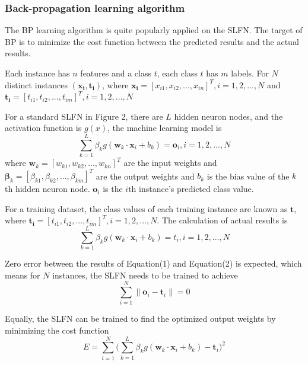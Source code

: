 \documentclass[a4paper, 14pt]{extarticle}
\begin{document}
\subsubsection{Back-propagation learning algorithm}
\par The BP learning algorithm is quite popularly applied on the SLFN. The target of BP is to minimize the cost function between the predicted results and the actual results. 
\par Each instance has \(n\) features and a class \(t\), each class \(t\) has \(m\) labels. For \(N\) distinct instances \((\mathbf{x_i}, \mathbf{t_i})\), where \(\mathbf{x_i} = [x_{i1}, x_{i2}, ..., x_{in}]^T , i = 1, 2, ..., N\) and \(\mathbf{t_i} = [t_{i1}, t_{i2}, ..., t_{im}]^T , i = 1, 2, ..., N\) \cite{G.B.Huang-ICNN}
\par For a standard SLFN in Figure 2, there are \(L\) hidden neuron nodes, and the activation function is \(g(x)\), the machine learning model is\cite{G.B.Huang-ICNN} 
\begin{equation}
  \sum_{k=1}^L{\beta_k}g(\mathbf{w}_k \cdot \mathbf{x}_i + b_k) = \mathbf{o}_i,  i = 1, 2, ..., N
\end{equation}
where \( \mathbf{w}_k = [w_{k1}, w_{k2}, ..., w_{kn}]^T \) are the input weights and \( \mathbf{\beta}_k = [\beta_{k1}, \beta_{k2}, ..., \beta_{km}]^T \) are the output weights and \(b_k\) is the bias value of the \(k\)th hidden neuron node. \(\mathbf{o}_i\) is the \(i\)th instance's predicted class value. 
\par For a training dataset, the class values of each training instance are known as \(\mathbf{t}\), where \(\mathbf{t_i} = [t_{i1}, t_{i2}, ..., t_{im}]^T , i = 1, 2, ..., N\). The calculation of actual results is \cite{G.B.Huang-ICNN}
\begin{equation}
  \sum_{k=1}^L{\beta_k}g(\mathbf{w}_k \cdot \mathbf{x}_i + b_k) = t_i,  i = 1, 2, ..., N
\end{equation}
\par Zero error between the results of Equation(1) and Equation(2) is expected, which means for \(N\) instances, the SLFN needs to be trained to achieve
\begin{equation}
    \sum_{i=1}^N\parallel \mathbf{o}_i - \mathbf{t}_i \parallel = 0
\end{equation}
\par Equally, the SLFN can be trained to find the optimized output weights by minimizing the cost function
\begin{equation}
    E = \sum_{i=1}^N\bigg(\sum_{k=1}^L\beta_kg(\mathbf{w}_k \cdot \mathbf{x}_i+ b_k)-\mathbf{t}_i\bigg)^2
\end{equation}
\end{document}
